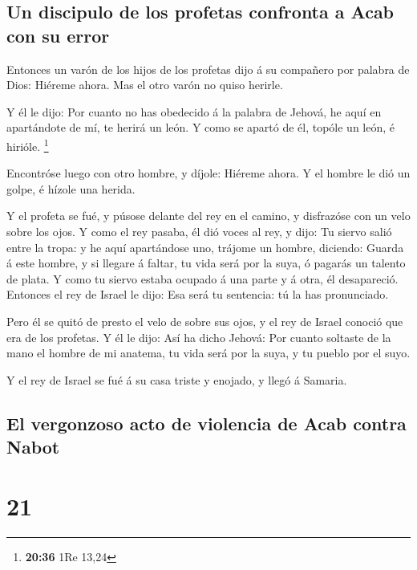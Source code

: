 \hypertarget{un-discipulo-de-los-profetas-confronta-a-acab-con-su-error}{%
\subsection{Un discipulo de los profetas confronta a Acab con su
error}\label{un-discipulo-de-los-profetas-confronta-a-acab-con-su-error}}

 Entonces un varón de los hijos de los profetas dijo á su
compañero por palabra de Dios: Hiéreme ahora. Mas el otro varón no quiso
herirle.

 Y él le dijo: Por cuanto no has obedecido á la palabra de
Jehová, he aquí en apartándote de mí, te herirá un león. Y como se
apartó de él, topóle un león, é hirióle. \footnote{\textbf{20:36} 1Re
  13,24}

 Encontróse luego con otro hombre, y díjole: Hiéreme ahora.
Y el hombre le dió un golpe, é hízole una herida.

 Y el profeta se fué, y púsose delante del rey en el
camino, y disfrazóse con un velo sobre los ojos.  Y como el
rey pasaba, él dió voces al rey, y dijo: Tu siervo salió entre la tropa:
y he aquí apartándose uno, trájome un hombre, diciendo: Guarda á este
hombre, y si llegare á faltar, tu vida será por la suya, ó pagarás un
talento de plata.  Y como tu siervo estaba ocupado á una
parte y á otra, él desapareció. Entonces el rey de Israel le dijo: Esa
será tu sentencia: tú la has pronunciado.

 Pero él se quitó de presto el velo de sobre sus ojos, y el
rey de Israel conoció que era de los profetas.  Y él le
dijo: Así ha dicho Jehová: Por cuanto soltaste de la mano el hombre de
mi anatema, tu vida será por la suya, y tu pueblo por el suyo.

 Y el rey de Israel se fué á su casa triste y enojado, y
llegó á Samaria.

\hypertarget{el-vergonzoso-acto-de-violencia-de-acab-contra-nabot}{%
\subsection{El vergonzoso acto de violencia de Acab contra
Nabot}\label{el-vergonzoso-acto-de-violencia-de-acab-contra-nabot}}

\hypertarget{section-20}{%
\section{21}\label{section-20}}

